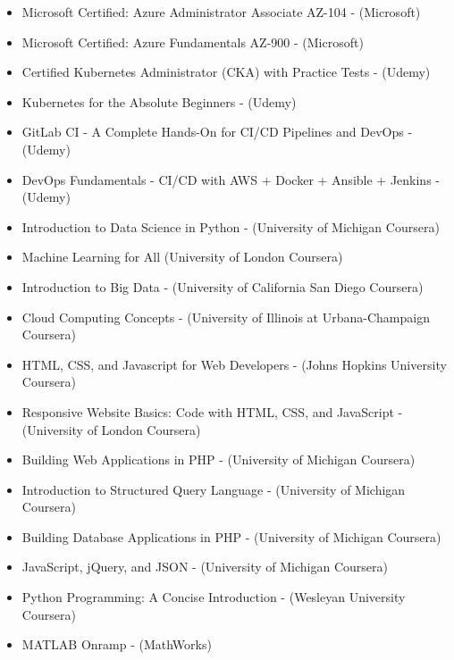 \documentclass[10pt,a4paper,ragged2e,withhyper]{altacv}
\let\olditem\item
\renewcommand{\item}{\small\olditem}
\begin{document}
\begin{paracol}{2}
\begin{itemize}
\item {Microsoft Certified: Azure Administrator Associate AZ-104 -} {\scriptsize(Microsoft)}
\item {Microsoft Certified: Azure Fundamentals AZ-900 -} {\scriptsize(Microsoft)}
\item {Certified Kubernetes Administrator (CKA) with Practice Tests -} {\scriptsize(Udemy)}
\item {Kubernetes for the Absolute Beginners -} {\scriptsize(Udemy)}
\item {GitLab CI - A Complete Hands-On for CI/CD Pipelines and DevOps -} {\scriptsize(Udemy)}
\item {DevOps Fundamentals - CI/CD with AWS + Docker + Ansible + Jenkins -} {\scriptsize(Udemy)}
\item {Introduction to Data Science in Python -} {\scriptsize(University of Michigan Coursera)}
\item {Machine Learning for All} {\scriptsize(University of London Coursera)}
\item {Introduction to Big Data -} {\scriptsize(University of California San Diego Coursera)}
\item {Cloud Computing Concepts -} {\scriptsize(University of Illinois at Urbana-Champaign Coursera)}
\item {HTML, CSS, and Javascript for Web Developers -} {\scriptsize(Johns Hopkins University Coursera)}
\item {Responsive Website Basics: Code with HTML, CSS, and JavaScript -} {\scriptsize(University of London Coursera)}
\item {Building Web Applications in PHP -} {\scriptsize(University of Michigan Coursera)}
\item {Introduction to Structured Query Language -} {\scriptsize(University of Michigan Coursera)}
\item {Building Database Applications in PHP -} {\scriptsize(University of Michigan Coursera)}
\item {JavaScript, jQuery, and JSON -} {\scriptsize(University of Michigan Coursera)}
\item {Python Programming: A Concise Introduction -} {\scriptsize(Wesleyan University Coursera)}
\item {MATLAB Onramp -} {\scriptsize(MathWorks)}
\end{itemize}




\end{paracol}
\end{document}
